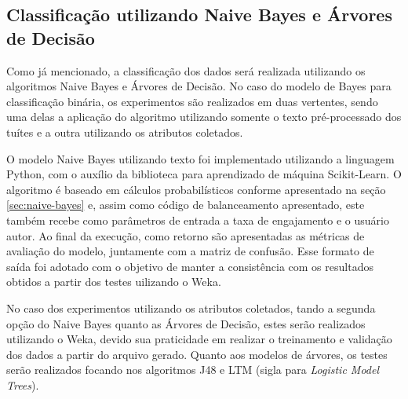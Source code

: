 \documentclass[oneside,openright,12pt]{ufsm_2015} %
\begin{document}

\subsection{Classificação utilizando Naive Bayes e Árvores de Decisão}
\label{sec:class-naive-tree}

    \par Como já mencionado, a classificação dos dados será realizada utilizando os algoritmos Naive Bayes e Árvores de Decisão. No caso do modelo de Bayes para classificação binária, os experimentos são realizados em duas vertentes, sendo uma delas a aplicação do algoritmo utilizando somente o texto pré-processado dos tuítes e a outra utilizando os atributos coletados.
    
    \par O modelo Naive Bayes utilizando texto foi implementado utilizando a linguagem Python, com o auxílio da biblioteca para aprendizado de máquina Scikit-Learn. O algoritmo é baseado em cálculos probabilísticos conforme apresentado na seção \ref{sec:naive-bayes} e, assim como código de balanceamento apresentado, este também recebe como parâmetros de entrada a taxa de engajamento e o usuário autor. Ao final da execução, como retorno são apresentadas as métricas de avaliação do modelo, juntamente com a matriz de confusão. Esse formato de saída foi adotado com o objetivo de manter a consistência com os resultados obtidos a partir dos testes uilizando o Weka.
    
    \par No caso dos experimentos utilizando os atributos coletados, tando a segunda opção do Naive Bayes quanto as Árvores de Decisão, estes serão realizados utilizando o Weka, devido sua praticidade em realizar o treinamento e validação dos dados a partir do arquivo gerado. Quanto aos modelos de árvores, os testes serão realizados focando nos algoritmos J48  e LTM (sigla para \textit{Logistic Model Trees}).


\end{document}
